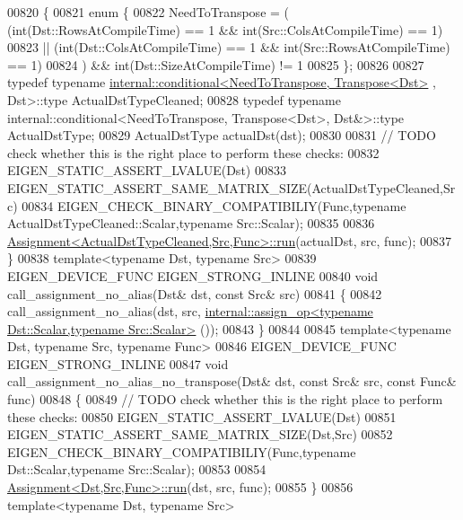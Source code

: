 \begin{DoxyCode}
00820 \{
00821   \textcolor{keyword}{enum} \{
00822     NeedToTranspose = (    (int(Dst::RowsAtCompileTime) == 1 && int(Src::ColsAtCompileTime) == 1)
00823                         || (\textcolor{keywordtype}{int}(Dst::ColsAtCompileTime) == 1 && int(Src::RowsAtCompileTime) == 1)
00824                       ) && int(Dst::SizeAtCompileTime) != 1
00825   \};
00826 
00827   \textcolor{keyword}{typedef} \textcolor{keyword}{typename} \hyperlink{struct_eigen_1_1internal_1_1conditional}{internal::conditional<NeedToTranspose, Transpose<Dst>}
      , Dst>::type ActualDstTypeCleaned;
00828   \textcolor{keyword}{typedef} \textcolor{keyword}{typename} internal::conditional<NeedToTranspose, Transpose<Dst>, Dst&>::type ActualDstType;
00829   ActualDstType actualDst(dst);
00830   
00831   \textcolor{comment}{// TODO check whether this is the right place to perform these checks:}
00832   EIGEN\_STATIC\_ASSERT\_LVALUE(Dst)
00833   EIGEN\_STATIC\_ASSERT\_SAME\_MATRIX\_SIZE(ActualDstTypeCleaned,Src)
00834   EIGEN\_CHECK\_BINARY\_COMPATIBILIY(Func,\textcolor{keyword}{typename} ActualDstTypeCleaned::Scalar,\textcolor{keyword}{typename} Src::Scalar);
00835   
00836   \hyperlink{struct_eigen_1_1internal_1_1_assignment}{Assignment<ActualDstTypeCleaned,Src,Func>::run}(actualDst, 
      src, func);
00837 \}
00838 \textcolor{keyword}{template}<\textcolor{keyword}{typename} Dst, \textcolor{keyword}{typename} Src>
00839 EIGEN\_DEVICE\_FUNC EIGEN\_STRONG\_INLINE
00840 \textcolor{keywordtype}{void} call\_assignment\_no\_alias(Dst& dst, \textcolor{keyword}{const} Src& src)
00841 \{
00842   call\_assignment\_no\_alias(dst, src, 
      \hyperlink{struct_eigen_1_1internal_1_1assign__op}{internal::assign\_op<typename Dst::Scalar,typename Src::Scalar>}
      ());
00843 \}
00844 
00845 \textcolor{keyword}{template}<\textcolor{keyword}{typename} Dst, \textcolor{keyword}{typename} Src, \textcolor{keyword}{typename} Func>
00846 EIGEN\_DEVICE\_FUNC EIGEN\_STRONG\_INLINE
00847 \textcolor{keywordtype}{void} call\_assignment\_no\_alias\_no\_transpose(Dst& dst, \textcolor{keyword}{const} Src& src, \textcolor{keyword}{const} Func& func)
00848 \{
00849   \textcolor{comment}{// TODO check whether this is the right place to perform these checks:}
00850   EIGEN\_STATIC\_ASSERT\_LVALUE(Dst)
00851   EIGEN\_STATIC\_ASSERT\_SAME\_MATRIX\_SIZE(Dst,Src)
00852   EIGEN\_CHECK\_BINARY\_COMPATIBILIY(Func,\textcolor{keyword}{typename} Dst::Scalar,\textcolor{keyword}{typename} Src::Scalar);
00853 
00854   \hyperlink{struct_eigen_1_1internal_1_1_assignment}{Assignment<Dst,Src,Func>::run}(dst, src, func);
00855 \}
00856 \textcolor{keyword}{template}<\textcolor{keyword}{typename} Dst, \textcolor{keyword}{typename} Src>

\end{DoxyCode}
